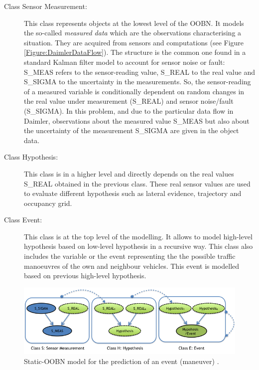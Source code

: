 \begin{description}
\item[Class Sensor Measurement:]  This class represents objects at the lowest level of the OOBN. It models the so-called \textit{measured data} which are  the observations characterising a situation. They are acquired from sensors and computations (see Figure \ref{Figure:DaimlerDataFlow}). The structure is the common one found in a standard Kalman filter model to account for sensor noise or fault:  S\_MEAS refers to the sensor-reading value, S\_REAL to the real value and S\_SIGMA to the uncertainty in the measurements. So, the sensor-reading of a measured variable is conditionally dependent on random changes in the real value under measurement (S\_REAL) and sensor noise/fault (S\_SIGMA).  In this problem,  and due to the particular data flow in  Daimler, observations about the measured value S\_MEAS but also about the uncertainty of the measurement S\_SIGMA are given in the object data. 

\item[Class Hypothesis:] This class is in a higher level and  directly depends on the real values S\_REAL obtained in the previous class. These real sensor values  are used to evaluate different hypothesis such as lateral evidence, trajectory and occupancy grid. 

\item[Class Event:] This class is at the top level of the modelling. It allows to model high-level hypothesis based on low-level hypothesis in a recursive way. This class also includes the variable or the event  representing the the possible traffic manoeuvres of the own and neighbour vehicles. This event is modelled based on previous high-level hypothesis. 

\end{description}

\begin{figure}
\begin{center}
\includegraphics[scale=0.58]{./figures/DaimlerOOBNAbstraction}
\caption{\label{Figure:DaimlerOOBNAbstraction} Static-OOBN model for the prediction of an event (maneuver) \cite{Weidl2014}.}
\end{center}
\end{figure}

